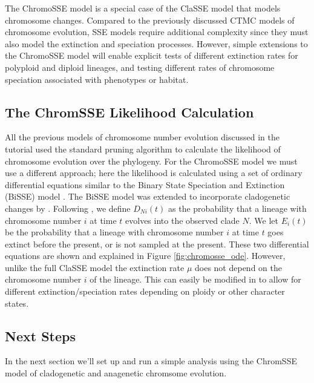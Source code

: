 The ChromoSSE model \citep{freyman2016cladogenetic}
is a special case of the ClaSSE model that models chromosome
changes.
Compared to the previously discussed CTMC models of chromosome evolution,
SSE models require additional complexity since they must also
model the extinction and speciation processes.
However, simple extensions to the ChromoSSE model will enable explicit 
tests of different extinction rates for polyploid and diploid lineages,
and testing different rates of chromosome speciation associated with phenotypes or habitat.

\subsection{The ChromSSE Likelihood Calculation}

All the previous models of chromosome number evolution discussed in the tutorial used
the standard pruning algorithm \citep{felsenstein81} to calculate
the likelihood of chromosome evolution over the phylogeny.
For the ChromoSSE model we must use a different approach;
here the likelihood is calculated using a set of ordinary differential
equations similar to the
Binary State Speciation and Extinction (BiSSE) model \citep{maddison2007estimating}.
The BiSSE model was extended to incorporate cladogenetic changes
by \citet{goldberg2012tempo}.
Following \citet{goldberg2012tempo}, we define
$D_{Ni}(t)$ as the probability that a lineage with
chromosome number $i$ at time $t$ evolves into the observed clade $N$.
We let $E_i(t)$ be the probability that a lineage
with chromosome number $i$ at time $t$ goes extinct before the present, or is not sampled at the present.
These two differential equations are shown and explained in Figure \ref{fig:chromosse_ode}.
However, unlike the full ClaSSE model the
extinction rate $\mu$ does not depend on the
chromosome number $i$ of the lineage.
This can easily be modified in \RevBayes to allow for different extinction/speciation rates
depending on ploidy or other character states.


\subsection{Next Steps}


In the next section we'll set up and run a simple \RevBayes analysis using the ChromSSE model
of cladogenetic and anagenetic chromsome evolution.


\newpage
